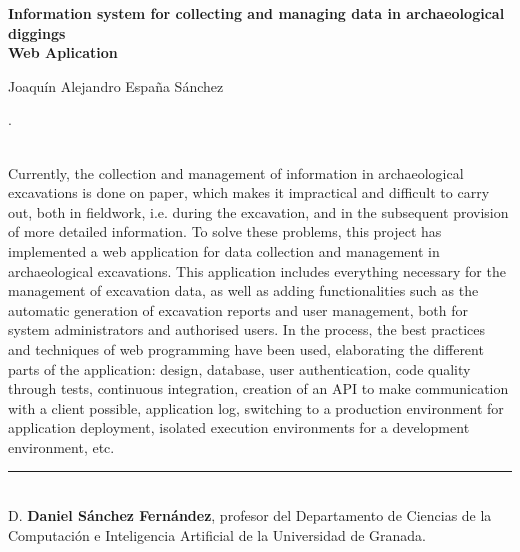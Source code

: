 \clearpage

\begin{center}
	{\large\bfseries Information system for collecting and managing data in archaeological diggings\\ Web Aplication}\\
\end{center}
\begin{center}
	Joaquín Alejandro España Sánchez\\
\end{center}
\vspace{0.5cm}
. \\
\vspace{0.7cm}

 \\

Currently, the collection and management of information in archaeological excavations is done on paper, which makes it impractical and difficult to carry out, both in fieldwork, i.e. during the
excavation, and in the subsequent provision of more detailed information. To solve these problems, this project has implemented a web application for data collection and management in archaeological
excavations. This application includes everything necessary for the management of excavation data, as well as adding functionalities such as the automatic generation of excavation reports and user
management, both for system administrators and authorised users. In the process, the best practices and techniques of web programming have been used, elaborating the different parts of the application:
design, database, user authentication, code quality through tests, continuous integration, creation of an API to make communication with a client possible, application log, switching to a production
environment for application deployment, isolated execution environments for a development environment, etc.


\cleardoublepage

\thispagestyle{empty}

\noindent\rule[-1ex]{\textwidth}{2pt}\\[4.5ex]

D. \textbf{Daniel Sánchez Fernández}, profesor del Departamento de Ciencias de la Computación
e Inteligencia Artificial de la Universidad de Granada.


